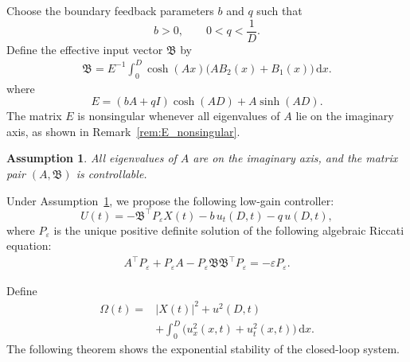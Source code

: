 \documentclass{IEEEtran}
\newtheorem{assumption}{Assumption}[section]
\theoremstyle{definition}
\begin{document}
Choose the boundary feedback parameters $b$ and $q$ such that
\begin{equation}
 b>0,\qquad 0<q<\frac{1}{D}.
\label{eq:parameterChoice}
\end{equation}
Define the effective input vector $\mathfrak B$ by
\begin{equation}
\begin{aligned}
 \mathfrak B=E^{-1}\int_0^D\cosh(Ax)\bigl(AB_2(x)
             +B_1(x)\bigr)\,\mathrm dx.
\end{aligned}
\label{eq:effectiveB}
\end{equation}
where
\begin{equation}
 E=(bA+qI)\cosh(AD)+A\sinh(AD).
\label{eq:effectiveE}
\end{equation}
The matrix $E$ is nonsingular whenever all eigenvalues of $A$
lie on the imaginary axis, as shown in Remark~\ref{rem:E_nonsingular}.

\begin{assumption}
\label{ass:marginal}
All eigenvalues of $A$ are on the imaginary axis, and the matrix pair
$(A,\mathfrak B)$ is controllable.
\end{assumption}

Under Assumption~\ref{ass:marginal}, we propose the following low-gain
controller:
\begin{equation}
U(t)=-\mathfrak B^\top P_\varepsilon X(t)-b\,u_t(D,t)-q\,u(D,t),
\label{eq:controller}
\end{equation}
where $P_\varepsilon$ is the unique positive definite solution of the
following algebraic Riccati equation:
\begin{equation}
\begin{aligned}
 A^\top P_\varepsilon+P_\varepsilon A
 -P_\varepsilon\mathfrak B\mathfrak B^\top P_\varepsilon
 =-\varepsilon P_\varepsilon.
\end{aligned}
\label{eq:main_are}
\end{equation}

Define
\begin{equation}
\begin{aligned}
 \Omega(t)={}&|X(t)|^2+u^2(D,t)\\
 &+\int_0^D\bigl(u_x^2(x,t)+u_t^2(x,t)\bigr)\,\mathrm dx.
\end{aligned}
\label{eq:energy}
\end{equation}
The following theorem shows the exponential stability of the closed-loop
system.
\end{document}
